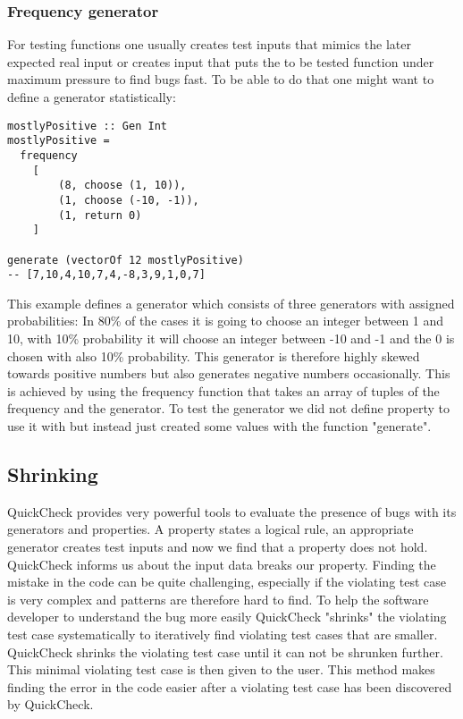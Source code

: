\documentclass[a4paper, 12pt]{article} %
\begin{document}
\subsubsection{Frequency generator}

For testing functions one usually creates test inputs that mimics the later expected real input or creates input that puts the to be tested function under maximum pressure to find bugs fast. To be able to do that one might want to define a generator statistically:

\begin{verbatim}
mostlyPositive :: Gen Int
mostlyPositive =
  frequency
    [ 
        (8, choose (1, 10)),
        (1, choose (-10, -1)),
        (1, return 0)
    ]

generate (vectorOf 12 mostlyPositive) 
-- [7,10,4,10,7,4,-8,3,9,1,0,7]
\end{verbatim}

This example defines a generator which consists of three generators with assigned probabilities: In 80\% of the cases it is going to choose an integer between 1 and 10, with 10\% probability it will choose an integer between -10 and -1 and the 0 is chosen with also 10\% probability. This generator is therefore highly skewed towards positive numbers but also generates negative numbers occasionally. This is achieved by using the frequency function that takes an array of tuples of the frequency and the generator. To test the generator we did not define property to use it with but instead just created some values with the function "generate".

\subsection{Shrinking}

QuickCheck provides very powerful tools to evaluate the presence of bugs with its generators and properties. A property states a logical rule, an appropriate generator creates test inputs and now we find that a property does not hold. QuickCheck informs us about the input data breaks our property. Finding the mistake in the code can be quite challenging, especially if the violating test case is very complex and patterns are therefore hard to find. To help the software developer to understand the bug more easily QuickCheck "shrinks" the violating test case systematically to iteratively find violating test cases that are smaller. QuickCheck shrinks the violating test case until it can not be shrunken further. This minimal violating test case is then given to the user. This method makes finding the error in the code easier after a violating test case has been discovered by QuickCheck. \cite{Claessen2009}
\end{document}
